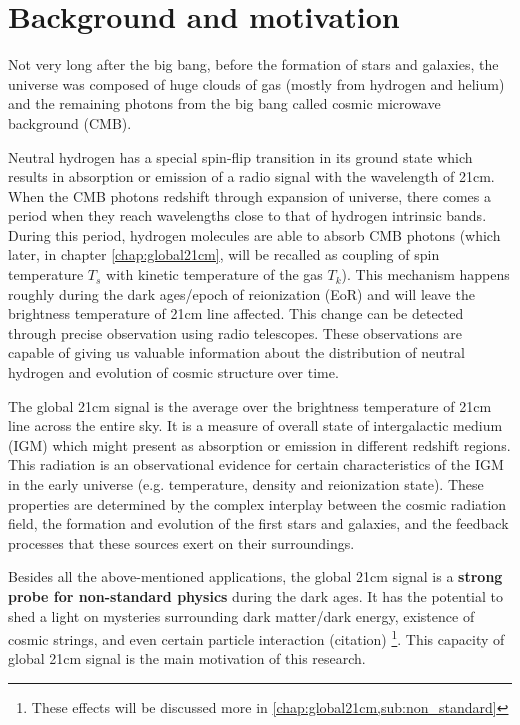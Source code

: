 \documentclass[12pt, TexShade, letterpaper]{report}
\begin{document}
\section{Background and motivation}
Not very long after the big bang, before the formation of stars and galaxies, the universe was composed of huge clouds of gas (mostly from hydrogen and helium) and the remaining photons from the big bang called cosmic microwave background (CMB). \par
Neutral hydrogen has a special spin-flip transition in its ground state which results in absorption or emission of a radio signal with the wavelength of 21cm. When the CMB photons redshift through expansion of universe, there comes a period when they reach wavelengths close to that of hydrogen intrinsic bands. During this period, hydrogen molecules are able to absorb CMB photons (which later, in chapter \ref{chap:global21cm}, will be recalled as coupling of spin temperature $T_s$ with kinetic temperature of the gas $T_k$). This mechanism happens roughly during the dark ages/epoch of reionization (EoR) and will leave the brightness temperature of 21cm line affected. This change can be detected through precise observation using radio telescopes. These observations are capable of giving us valuable information about the distribution of neutral hydrogen and evolution of cosmic structure over time\cite{low_frequency}.\par
The global 21cm signal is the average over the brightness temperature of 21cm line across the entire sky. It is a measure of overall state of intergalactic medium (IGM) which might present as absorption or emission in different redshift regions. This radiation is an observational evidence for certain characteristics of the IGM in the early universe (e.g. temperature, density and reionization state). These properties are determined by the complex interplay between the cosmic radiation field, the formation and evolution of the first stars and galaxies, and the feedback processes that these sources exert on their surroundings\cite{21century}.\par
Besides all the above-mentioned applications, the global 21cm signal is a \textbf{strong probe for non-standard physics} during the dark ages. It has the potential to shed a light on mysteries surrounding dark matter/dark energy, existence of cosmic strings, and even certain particle interaction (citation) \footnote{These effects will be discussed more in \ref{chap:global21cm,sub:non_standard}}. This capacity of global 21cm signal is the main motivation of this research.\par
\end{document}
